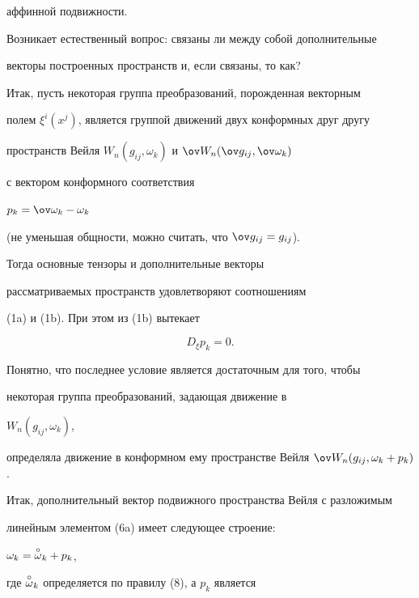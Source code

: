 аффинной подвижности. 


 


Возникает естественный вопрос: связаны ли между собой дополнительные 


векторы построенных пространств и, если связаны, то как? 


 


Итак, пусть некоторая группа преобразований, порожденная векторным 


полем $\xi^i(x^j)$, является группой движений двух конформных друг другу 


пространств Вейля $W_n(g_{ij},\omega_k)$ и $\ov W_n(\ov 


g_{ij},\ov\omega_k)$


с вектором конформного соответствия 


$p_k=\ov\omega_k-\omega_k$


(не уменьшая общности, можно считать, что $\ov g_{ij}=g_{ij}$).


Тогда основные тензоры и дополнительные векторы 


рассматриваемых пространств удовлетворяют соотношениям 


(1a) и (1b). При этом из (1b) вытекает


\begin{equation} 


D_\xi p_k=0. 


\end{equation} 


 


Понятно, что последнее условие является достаточным для того, чтобы 


некоторая группа преобразований, задающая движение в 


$W_n(g_{ij},\omega_k)$, 


определяла движение в конформном ему пространстве Вейля $\ov 


W_n(g_{ij},\omega_k+p_k)$. 


 


Итак, дополнительный вектор подвижного пространства Вейля с разложимым 


линейным элементом (6a) имеет следующее строение: 


$\omega_k=\overset{\circ}{\omega}{}_k+p_k$, 


где $\overset{\circ}{\omega}{}_k$ определяется по правилу (8), а $p_k$ является 


